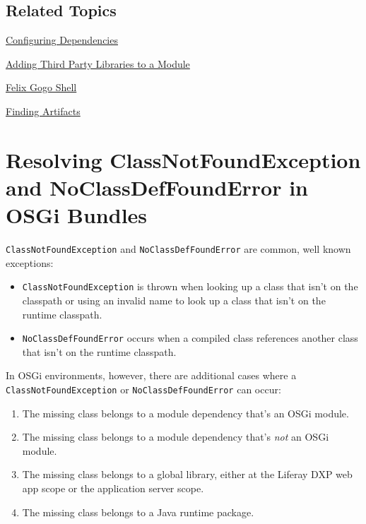 \noindent\hrulefill

\section{Related Topics}\label{related-topics-34}

\href{/docs/7-2/customization/-/knowledge_base/c/configuring-dependencies}{Configuring
Dependencies}

\href{/docs/7-2/customization/-/knowledge_base/c/adding-third-party-libraries-to-a-module}{Adding
Third Party Libraries to a Module}

\href{/docs/7-2/customization/-/knowledge_base/c/using-the-felix-gogo-shell}{Felix
Gogo Shell}

\href{/docs/7-2/customization/-/knowledge_base/c/finding-artifacts}{Finding
Artifacts}

\chapter{Resolving ClassNotFoundException and NoClassDefFoundError in
OSGi
Bundles}\label{resolving-classnotfoundexception-and-noclassdeffounderror-in-osgi-bundles}

\texttt{ClassNotFoundException} and \texttt{NoClassDefFoundError} are
common, well known exceptions:

\begin{itemize}
\tightlist
\item
  \texttt{ClassNotFoundException} is thrown when looking up a class that
  isn't on the classpath or using an invalid name to look up a class
  that isn't on the runtime classpath.
\item
  \texttt{NoClassDefFoundError} occurs when a compiled class references
  another class that isn't on the runtime classpath.
\end{itemize}

In OSGi environments, however, there are additional cases where a
\texttt{ClassNotFoundException} or \texttt{NoClassDefFoundError} can
occur:

\begin{enumerate}
\def\labelenumi{\arabic{enumi}.}
\tightlist
\item
  The missing class belongs to a module dependency that's an OSGi
  module.
\item
  The missing class belongs to a module dependency that's \emph{not} an
  OSGi module.
\item
  The missing class belongs to a global library, either at the Liferay
  DXP web app scope or the application server scope.
\item
  The missing class belongs to a Java runtime package.
\end{enumerate}


